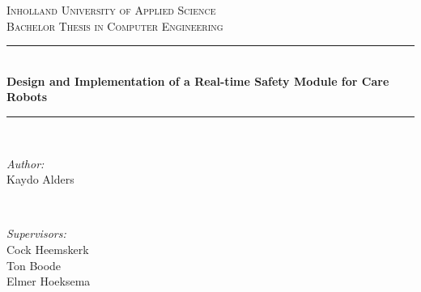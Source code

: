 \documentclass[12pt]{scrreprt}
\begin{document}

\lstset{escapechar=@,style=customc}


\begin{titlepage}

\newcommand{\HRule}{\rule{\linewidth}{0.5mm}} %

\center %
 

\textsc{\Large Inholland University of Applied Science}\\[1.5cm] %
\textsc{Bachelor Thesis in Computer Engineering}\\[0.5cm] %


\HRule \\[0.4cm]
{ \LARGE \bfseries Design and Implementation of a Real-time Safety Module for Care Robots}\\[0.4cm] %
\HRule \\[1.5cm]
 

\begin{minipage}{0.4\textwidth}
\begin{flushleft} \large
\emph{Author:}\\
Kaydo Alders %
\end{flushleft}
\end{minipage}
~
\begin{minipage}{0.4\textwidth}
\begin{flushright} \large
\emph{Supervisors:} \\
Cock Heemskerk \\ %
Ton Boode\\ %
Elmer Hoeksema \\ %
\end{flushright}
\end{minipage}\\[2cm]


\end{titlepage}
\end{document}
